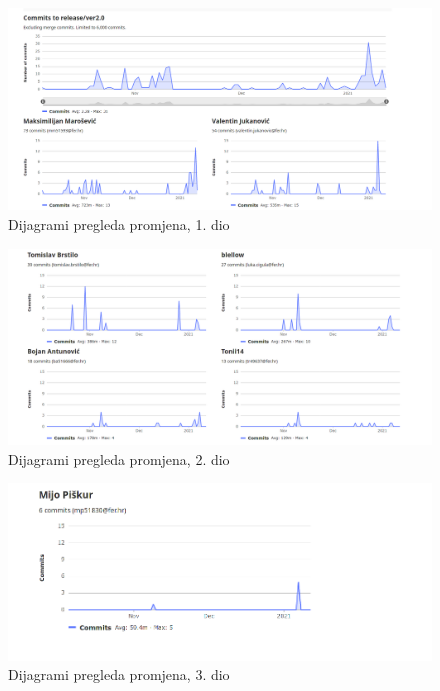 \begin{figure}[H]
	\includegraphics[width=.9\linewidth]{slike/20210115_000940.png}
	\centering
	\caption{Dijagrami pregleda promjena, 1. dio}
	\label{fig:contribution1}
\end{figure}	
\begin{figure}[H]
	\includegraphics[width=.9\linewidth]{slike/20210115_001017.png}
	\centering
	\caption{Dijagrami pregleda promjena, 2. dio}
	\label{fig:contribution2}
\end{figure}	
\begin{figure}[H]
	\includegraphics[width=.9\linewidth]{slike/20210115_001034.png}
	\centering
	\caption{Dijagrami pregleda promjena, 3. dio}
	\label{fig:contribution3}
\end{figure}	